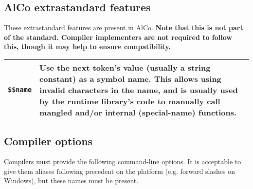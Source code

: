 \documentclass{article}
\begin{document}
\subsection{AlCo extrastandard features}
\label{sub:implementation:alcoextra}
These extrastandard features are present in AlCo. \textbf{Note that this is not
part of the standard. Compiler implementers are not required to follow this,
though it may help to ensure compatibility.}

\begin{center}
\begin{tabular}{|l|p{4in}|}
\hline
\texttt{\$\$name} & Use the next token's value (usually a string constant) as
  a symbol name. This allows using invalid characters in the name, and is
  usually used by the runtime library's code to manually call mangled and/or
  internal (special-name) functions. \\
\hline
\end{tabular}
\end{center}

\subsection{Compiler options}
\label{sub:implementation:options}
Compilers must provide the following command-line options. It is acceptable to
give them aliases following precedent on the platform (e.g. forward slashes
on Windows), but these names must be present.
\end{document}
